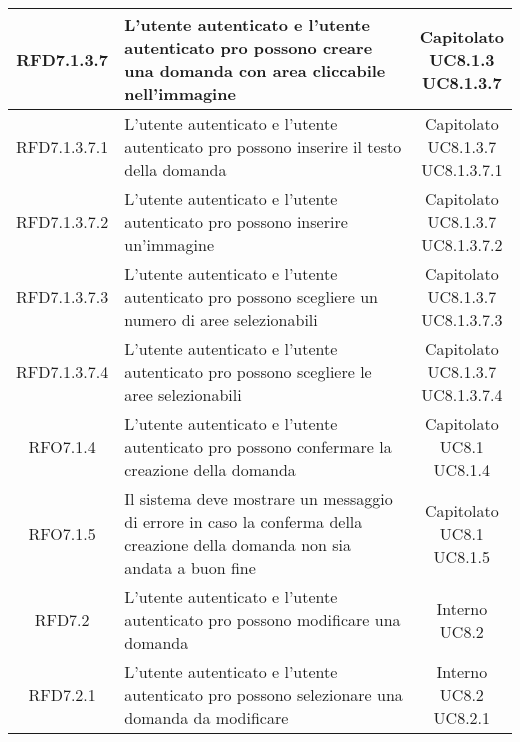 \begin{longtable}{|c|>{\centering}m{7cm}|c|}
			 \hypertarget{{RFD7.1.3.7}}{{RFD7.1.3.7}} & L’utente autenticato e l’utente autenticato pro possono creare una domanda con area cliccabile nell’immagine & \makecell{Capitolato\\ UC8.1.3 \\UC8.1.3.7 } \\ \hline
			 \hypertarget{{RFD7.1.3.7.1}}{{RFD7.1.3.7.1}} & L’utente autenticato e l’utente autenticato pro possono inserire il testo della domanda & \makecell{Capitolato\\ UC8.1.3.7 \\UC8.1.3.7.1 } \\ \hline
			 \hypertarget{{RFD7.1.3.7.2}}{{RFD7.1.3.7.2}} & L’utente autenticato e l’utente autenticato pro possono inserire un’immagine & \makecell{Capitolato\\ UC8.1.3.7 \\UC8.1.3.7.2 } \\ \hline
			 \hypertarget{{RFD7.1.3.7.3}}{{RFD7.1.3.7.3}} & L’utente autenticato e l’utente autenticato pro possono scegliere un numero di aree selezionabili & \makecell{Capitolato\\ UC8.1.3.7 \\UC8.1.3.7.3 } \\ \hline
			 \hypertarget{{RFD7.1.3.7.4}}{{RFD7.1.3.7.4}} & L’utente autenticato e l’utente autenticato pro possono scegliere le aree  selezionabili & \makecell{Capitolato\\ UC8.1.3.7 \\UC8.1.3.7.4 } \\ \hline
			 \hypertarget{{RFO7.1.4}}{{RFO7.1.4}} & L’utente autenticato e l'utente autenticato pro possono confermare la creazione della domanda & \makecell{Capitolato\\ UC8.1 \\UC8.1.4 } \\ \hline
			 \hypertarget{{RFO7.1.5}}{{RFO7.1.5}} & Il sistema deve mostrare un messaggio di errore in caso la conferma della creazione della domanda non sia andata a buon fine & \makecell{Capitolato\\ UC8.1 \\UC8.1.5 } \\ \hline
			 \hypertarget{{RFD7.2}}{{RFD7.2}} & L’utente autenticato e l’utente autenticato pro possono modificare una domanda & \makecell{Interno\\ UC8.2 } \\ \hline
			 \hypertarget{{RFD7.2.1}}{{RFD7.2.1}} & L’utente autenticato e l'utente autenticato pro possono selezionare una domanda da modificare & \makecell{Interno\\ UC8.2 \\UC8.2.1 } \\ \hline

\end{longtable}
